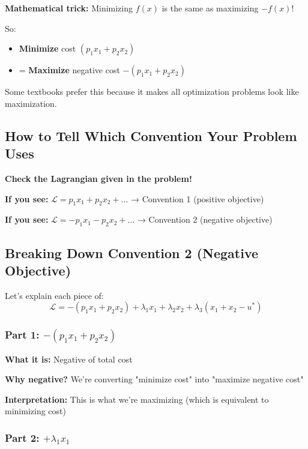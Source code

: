 \documentclass[11pt]{article}
\begin{document}
\begin{tcolorbox}[colback=red!5!white,colframe=red!75!black,title=Why the Negative Sign?]
\textbf{Mathematical trick:} Minimizing $f(x)$ is the same as maximizing $-f(x)$!

So:
\begin{itemize}
\item \textbf{Minimize} cost $(p_1 x_1 + p_2 x_2)$
\item = \textbf{Maximize} negative cost $-(p_1 x_1 + p_2 x_2)$
\end{itemize}

Some textbooks prefer this because it makes all optimization problems look like maximization.
\end{tcolorbox}

\subsection{How to Tell Which Convention Your Problem Uses}

\textbf{Check the Lagrangian given in the problem!}

\textbf{If you see:} $\mathcal{L} = p_1 x_1 + p_2 x_2 + \ldots$ → Convention 1 (positive objective)

\textbf{If you see:} $\mathcal{L} = -p_1 x_1 - p_2 x_2 + \ldots$ → Convention 2 (negative objective)

\subsection{Breaking Down Convention 2 (Negative Objective)}

Let's explain each piece of:
$$\mathcal{L} = -(p_1 x_1 + p_2 x_2) + \lambda_1 x_1 + \lambda_2 x_2 + \lambda_3(x_1 + x_2 - u^*)$$

\subsubsection{Part 1: $-(p_1 x_1 + p_2 x_2)$}

\textbf{What it is:} Negative of total cost

\textbf{Why negative?} We're converting "minimize cost" into "maximize negative cost"

\textbf{Interpretation:} This is what we're maximizing (which is equivalent to minimizing cost)

\subsubsection{Part 2: $+\lambda_1 x_1$}
\end{document}
